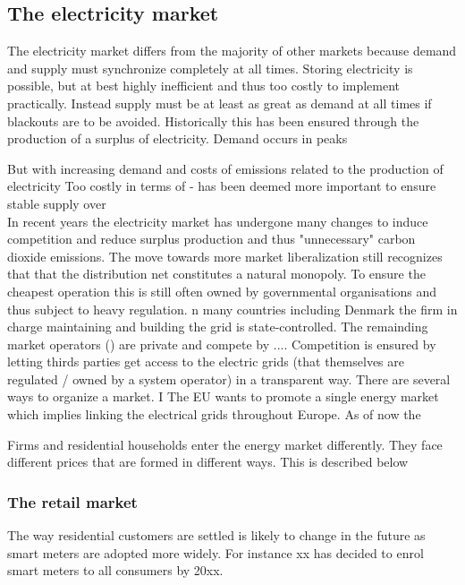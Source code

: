 \label{sec:theory}

\subsection{The electricity market}
\label{subsec:t_market}
The electricity market differs from the majority of other markets because demand and supply must synchronize completely at all times. Storing electricity is possible, but at best highly inefficient and thus too costly to implement practically. Instead supply must be at least as great as demand at all times if blackouts are to be avoided. Historically this has been ensured through the production of a surplus of electricity. Demand occurs in peaks 

But with increasing demand and costs of emissions related to the production of electricity Too costly in terms of  - has been deemed more important to ensure stable supply over  
\medskip\\
In recent years the electricity market has undergone many changes to induce competition and reduce surplus production and thus "unnecessary" carbon dioxide emissions. The move towards more market liberalization still recognizes that that the distribution net constitutes a natural monopoly. To ensure the cheapest operation this is still often owned by governmental organisations and thus subject to heavy regulation. n many countries including Denmark the firm in charge maintaining and building the grid is state-controlled. The remainding market operators () are private and compete by .... Competition is ensured by letting thirds parties get access to the electric grids (that themselves are regulated / owned by a system operator) in a transparent way.
There are several ways to organize a market.  I  The EU wants to promote a single energy market which implies linking the electrical grids throughout Europe. As of now the 

Firms and residential households enter the energy market differently. They face different prices that are formed in different ways. This is described below

\subsubsection{The retail market} %
\label{subsubsec: t_resmarket}

The way residential customers are settled is likely to change in the future as smart meters are adopted more widely. For instance xx has decided to enrol smart meters to all consumers by 20xx.  

